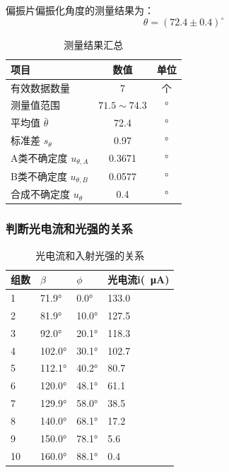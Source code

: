 \documentclass[10pt,a4paper]{ctexart}
\begin{document}
偏振片偏振化角度的测量结果为：
\[
\boxed{\theta = {(72.4 \pm 0.4)}^\circ}
\]

\begin{table}[H]
\centering
\caption{测量结果汇总}
\label{tab:result_summary}
\begin{tabular}{|l|c|c|}
\hline
\textbf{项目} & \textbf{数值} & \textbf{单位} \\ \hline
有效数据数量 & 7 & 个 \\ \hline
测量值范围 & $71.5 \sim 74.3$ & \si{\degree} \\ \hline
平均值 $\bar{\theta}$ & 72.4 & \si{\degree} \\ \hline
标准差 $s_\theta$ & 0.97 & \si{\degree} \\ \hline
A类不确定度 $u_{\theta,A}$ & 0.3671 & \si{\degree} \\ \hline
B类不确定度 $u_{\theta,B}$ & 0.0577 & \si{\degree} \\ \hline
合成不确定度 $u_\theta$ & 0.4 & \si{\degree} \\ \hline
\end{tabular}
\end{table}

\subsubsection{判断光电流和光强的关系}
\begin{table}[H]
\centering
\caption{光电流和入射光强的关系}
\label{tab:intense}
\begin{tabular}{|l|l|l|l|}
\hline
组数 & $\beta$  & $\phi$ &光电流i(\SI{}{\micro \ampere}) \\ \hline
1  & \ang{71.9}  &\ang{0.0}& 133.0 \\ \hline
2  & \ang{81.9}  & \ang{10.0} & 127.5 \\ \hline
3  & \ang{92.0}  & \ang{20.1} & 118.3 \\ \hline
4  & \ang{102.0}  & \ang{30.1} & 102.7 \\ \hline
5  & \ang{112.1}  & \ang{40.2} & 80.7 \\ \hline
6  & \ang{120.0}  & \ang{48.1} & 61.1 \\ \hline
7  & \ang{129.9}  & \ang{58.0} & 38.5 \\ \hline
8  & \ang{140.0}  & \ang{68.1} & 17.2 \\ \hline
9  & \ang{150.0} & \ang{78.1} & 5.6 \\ \hline
10 & \ang{160.0} & \ang{88.1} & 0.4 \\ \hline
\end{tabular}
\end{table}
\end{document}
